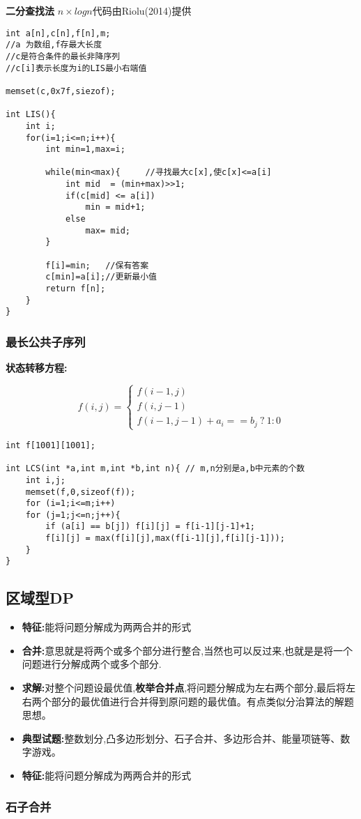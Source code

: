 \textbf{二分查找法} $n \times logn$代码由Riolu(2014)提供

\begin{lstlisting}
int a[n],c[n],f[n],m;
//a 为数组,f存最大长度
//c是符合条件的最长非降序列
//c[i]表示长度为i的LIS最小右端值

memset(c,0x7f,siezof);

int LIS(){
    int i;
    for(i=1;i<=n;i++){
        int min=1,max=i;

        while(min<max){     //寻找最大c[x],使c[x]<=a[i]
            int mid  = (min+max)>>1;
            if(c[mid] <= a[i])
                min = mid+1;
            else
                max= mid;
        }

        f[i]=min;   //保有答案
        c[min]=a[i];//更新最小值
        return f[n];
    }
}
\end{lstlisting}

\subsubsection{最长公共子序列}

\textbf{状态转移方程:}

$$
f(i,j) = 
\left\{\begin{matrix}
f(i-1,j)\\ 
f(i,j-1)\\ 
f(i-1,j-1)+a_i==b_j\ ?\ 1:0
\end{matrix}\right.
$$

\begin{lstlisting}
int f[1001][1001];

int LCS(int *a,int m,int *b,int n){ // m,n分别是a,b中元素的个数
    int i,j;
    memset(f,0,sizeof(f));
    for (i=1;i<=m;i++)
    for (j=1;j<=n;j++){
        if (a[i] == b[j]) f[i][j] = f[i-1][j-1]+1;
        f[i][j] = max(f[i][j],max(f[i-1][j],f[i][j-1]));
    }
}
\end{lstlisting}


\subsection{区域型DP}

\begin{itemize}
    \item \textbf{特征:}能将问题分解成为两两合并的形式 
    \item \textbf{合并:}意思就是将两个或多个部分进行整合,当然也可以反过来,也就是是将一个问题进行分解成两个或多个部分.
    \item \textbf{求解:}对整个问题设最优值,\textbf{枚举合并点},将问题分解成为左右两个部分,最后将左右两个部分的最优值进行合并得到原问题的最优值。有点类似分治算法的解题思想。 
    \item \textbf{典型试题:}整数划分,凸多边形划分、石子合并、多边形合并、能量项链等、数字游戏。
    \item \textbf{特征:}能将问题分解成为两两合并的形式 
\end{itemize}

\subsubsection{石子合并}
